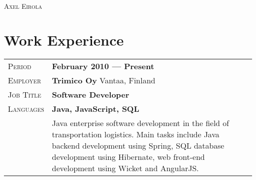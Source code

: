 \documentclass[a4paper, oneside, final]{scrartcl} %
\newcommand{\gray}{\rowcolor[gray]{.90}} %
\begin{document}
\begin{center} %


{\fontsize{36}{36}\selectfont\scshape Axel Eirola} %

\vspace{1.5cm} %





\section{Work Experience}

\begin{tabularx}{0.97\linewidth}{>{\raggedleft\scshape}p{2cm}X}
\gray Period & \textbf{February 2010 --- Present}\\
\gray Employer & \textbf{Trimico Oy} \hfill Vantaa, Finland\\
\gray Job Title & \textbf{Software Developer}\\
\gray Languages & \textbf{Java, JavaScript, SQL}\\
       & Java enterprise software development in the field of transportation logistics. Main tasks include Java backend development using Spring, SQL database development using Hibernate, web front-end development using Wicket and AngularJS.
\end{tabularx}


\end{center}
\end{document}
